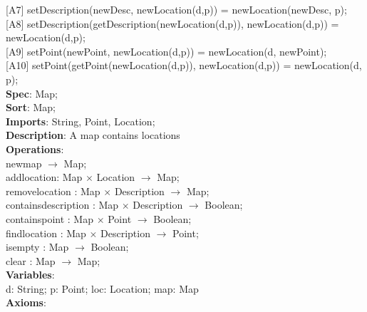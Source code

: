 \documentclass[12pt]{article}
\begin{document}
\begin{spacing}{1.5}
\hspace*{5mm} [A7] setDescription(newDesc, newLocation(d,p)) = newLocation(newDesc, p);\\
\hspace*{5mm} [A8] setDescription(getDescription(newLocation(d,p)), newLocation(d,p)) = newLocation(d,p);\\
\hspace*{5mm} [A9] setPoint(newPoint, newLocation(d,p)) = newLocation(d, newPoint);\\
\hspace*{5mm} [A10] setPoint(getPoint(newLocation(d,p)), newLocation(d,p)) = newLocation(d, p);\\

\noindent \textbf{Spec}: Map;\\
\noindent \textbf{Sort}: Map;\\
\noindent \textbf{Imports}: String, Point, Location;\\
\noindent \textbf{Description}: A map contains locations\\
\noindent \textbf{Operations}:\\
\hspace*{5mm} newmap $\rightarrow$ Map;\\
\hspace*{5mm} addlocation: Map $\times$ Location $\rightarrow$ Map;\\
\hspace*{5mm} removelocation : Map $\times$ Description $\rightarrow$ Map;\\
\hspace*{5mm} containsdescription : Map $\times$ Description $\rightarrow$ Boolean;\\
\hspace*{5mm} containspoint : Map $\times$ Point  $\rightarrow$ Boolean;\\
\hspace*{5mm} findlocation : Map $\times$ Description  $\rightarrow$ Point;\\
\hspace*{5mm} isempty : Map $\rightarrow$ Boolean;\\
\hspace*{5mm} clear : Map $\rightarrow$ Map;\\
\noindent \textbf{Variables}:\\
\hspace*{5mm} d: String; p: Point; loc: Location; map: Map\\
\noindent \textbf{Axioms}:\\

\end{spacing}
\end{document}
